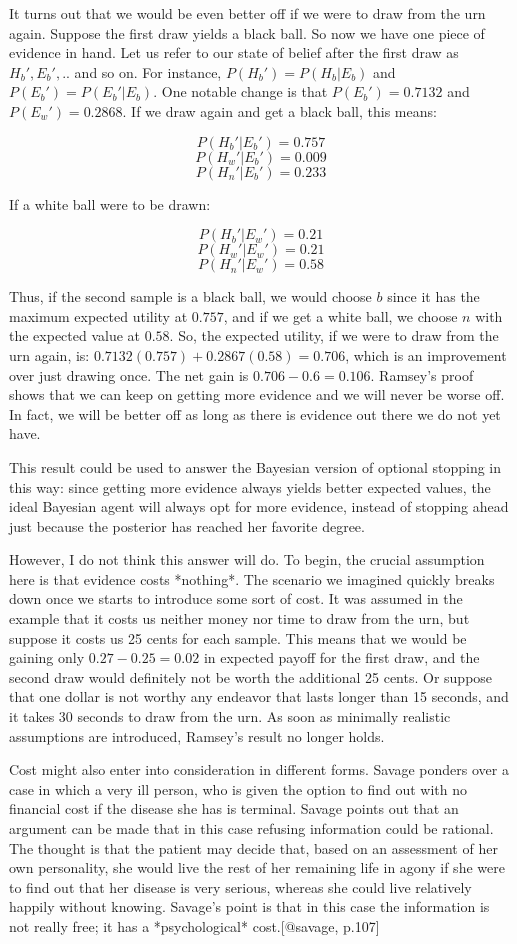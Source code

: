 It turns out that we would be even better off if we were to draw from
the urn again. Suppose the first draw yields a black ball. So now we
have one piece of evidence in hand. Let us refer to our state of belief
after the first draw as \(H_b', E_b',..\) and so on. For instance,
\(P(H_b') = P(H_b|E_b)\) and \(P(E_b') = P(E_b'|E_b)\). One notable
change is that \(P(E_b') = 0.7132\) and \(P(E_w')=0.2868\). If we draw
again and get a black ball, this means:

\[P(H_b'|E_b') = 0.757\] \[P(H_w'|E_b') = 0.009\]
\[P(H_n'|E_b') = 0.233\]

If a white ball were to be drawn:

\[P(H_b'|E_w') = 0.21\] \[P(H_w'|E_w') = 0.21\] \[P(H_n'|E_w') = 0.58\]

Thus, if the second sample is a black ball, we would choose \(b\) since
it has the maximum expected utility at \(0.757\), and if we get a white
ball, we choose \(n\) with the expected value at \(0.58\). So, the
expected utility, if we were to draw from the urn again, is:
\(0.7132(0.757) + 0.2867(0.58) = 0.706\), which is an improvement over
just drawing once. The net gain is \(0.706 - 0.6 = 0.106\). Ramsey's
proof shows that we can keep on getting more evidence and we will never
be worse off. In fact, we will be better off as long as there is
evidence out there we do not yet have.

This result could be used to answer the Bayesian version of optional
stopping in this way: since getting more evidence always yields better
expected values, the ideal Bayesian agent will always opt for more
evidence, instead of stopping ahead just because the posterior has
reached her favorite degree.

However, I do not think this answer will do. To begin, the crucial
assumption here is that evidence costs *nothing*. The scenario we
imagined quickly breaks down once we starts to introduce some sort of
cost. It was assumed in the example that it costs us neither money nor
time to draw from the urn, but suppose it costs us 25 cents for each
sample. This means that we would be gaining only \(0.27-0.25 = 0.02\) in
expected payoff for the first draw, and the second draw would definitely
not be worth the additional 25 cents. Or suppose that one dollar is not
worthy any endeavor that lasts longer than 15 seconds, and it takes 30
seconds to draw from the urn. As soon as minimally realistic assumptions
are introduced, Ramsey's result no longer holds.

Cost might also enter into consideration in different forms. Savage
ponders over a case in which a very ill person, who is given the option
to find out with no financial cost if the disease she has is terminal.
Savage points out that an argument can be made that in this case
refusing information could be rational. The thought is that the patient
may decide that, based on an assessment of her own personality, she
would live the rest of her remaining life in agony if she were to find
out that her disease is very serious, whereas she could live relatively
happily without knowing. Savage's point is that in this case the
information is not really free; it has a *psychological*
cost.{[}@savage, p.107{]}

